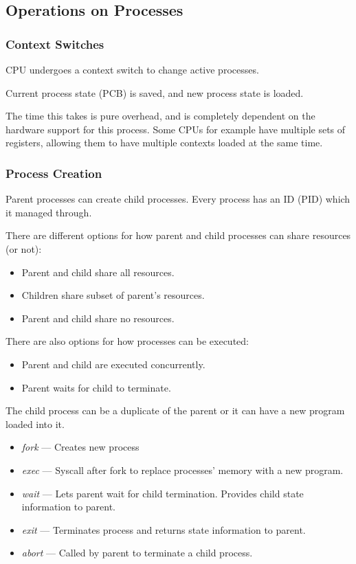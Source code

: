 \subsection{Operations on Processes}


\subsubsection{Context Switches}

CPU undergoes a context switch to change active processes.

Current process state (PCB) is saved, and new process state is loaded.

The time this takes is pure overhead, and is completely dependent
on the hardware support for this process. Some CPUs for example
have multiple sets of registers, allowing them to have multiple contexts
loaded at the same time.


\subsubsection{Process Creation}

Parent processes can create child processes. Every process has an ID (PID) which
it managed through.

There are different options for how parent and child processes can share resources (or not):
\begin{itemize}
    \item Parent and child share all resources.
    \item Children share subset of parent's resources.
    \item Parent and child share no resources.
\end{itemize}

There are also options for how processes can be executed:
\begin{itemize}
    \item Parent and child are executed concurrently.
    \item Parent waits for child to terminate.
\end{itemize}

The child process can be a duplicate of the parent or
it can have a new program loaded into it.
\begin{itemize}
    \item \textit{fork} --- Creates new process
    \item \textit{exec} --- Syscall after fork to replace processes' memory with a new program.
    \item \textit{wait} --- Lets parent wait for child termination. Provides child state information to parent.
    \item \textit{exit} --- Terminates process and returns state information to parent.
    \item \textit{abort} --- Called by parent to terminate a child process.
\end{itemize}

